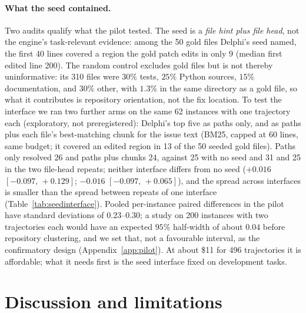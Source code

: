 \documentclass{article}
\newcommand{\ci}[2]{{\footnotesize$[#1,\,#2]$}}
\newcommand{\system}{Delphi}
\begin{document}
\paragraph{What the seed contained.} Two audits qualify what the pilot tested. The seed is a \emph{file hint plus file head}, not the engine's task-relevant evidence: among the 50 gold files \system{}'s seed named, the first 40 lines covered a region the gold patch edits in only 9 (median first edited line 200). The random control excludes gold files but is not thereby uninformative: its 310 files were $30\%$ tests, $25\%$ Python sources, $15\%$ documentation, and $30\%$ other, with $1.3\%$ in the same directory as a gold file, so what it contributes is repository orientation, not the fix location. To test the interface we ran two further arms on the same 62 instances with one trajectory each (exploratory, not preregistered): \system{}'s top five as paths only, and as paths plus each file's best-matching chunk for the issue text (BM25, capped at 60 lines, same budget; it covered an edited region in 13 of the 50 seeded gold files). Paths only resolved 26 and paths plus chunks 24, against 25 with no seed and 31 and 25 in the two file-head repeats; neither interface differs from no seed ($+0.016$ \ci{-0.097}{+0.129}; $-0.016$ \ci{-0.097}{+0.065}), and the spread across interfaces is smaller than the spread between repeats of one interface (Table~\ref{tab:seedinterface}). Pooled per-instance paired differences in the pilot have standard deviations of $0.23$--$0.30$; a study on 200 instances with two trajectories each would have an expected $95\%$ half-width of about $0.04$ before repository clustering, and we set that, not a favourable interval, as the confirmatory design (Appendix~\ref{app:pilot}). At about \$11 for 496 trajectories it is affordable; what it needs first is the seed interface fixed on development tasks.

\section{Discussion and limitations}
\label{sec:claims}
\end{document}
